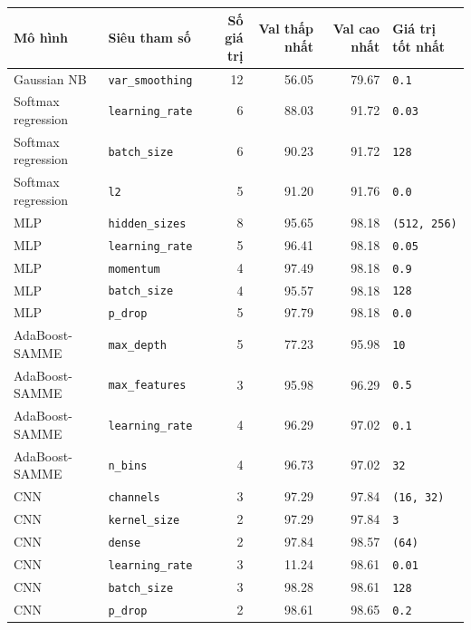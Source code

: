 \begin{tabular}{llrrrl}
\toprule
Mô hình & Siêu tham số & Số giá trị & Val thấp nhất & Val cao nhất & Giá trị tốt nhất \\
\midrule
Gaussian NB & \texttt{var\_smoothing} & 12 & 56.05 & 79.67 & \texttt{0.1} \\
Softmax regression & \texttt{learning\_rate} & 6 & 88.03 & 91.72 & \texttt{0.03} \\
Softmax regression & \texttt{batch\_size} & 6 & 90.23 & 91.72 & \texttt{128} \\
Softmax regression & \texttt{l2} & 5 & 91.20 & 91.76 & \texttt{0.0} \\
MLP & \texttt{hidden\_sizes} & 8 & 95.65 & 98.18 & \texttt{(512, 256)} \\
MLP & \texttt{learning\_rate} & 5 & 96.41 & 98.18 & \texttt{0.05} \\
MLP & \texttt{momentum} & 4 & 97.49 & 98.18 & \texttt{0.9} \\
MLP & \texttt{batch\_size} & 4 & 95.57 & 98.18 & \texttt{128} \\
MLP & \texttt{p\_drop} & 5 & 97.79 & 98.18 & \texttt{0.0} \\
AdaBoost-SAMME & \texttt{max\_depth} & 5 & 77.23 & 95.98 & \texttt{10} \\
AdaBoost-SAMME & \texttt{max\_features} & 3 & 95.98 & 96.29 & \texttt{0.5} \\
AdaBoost-SAMME & \texttt{learning\_rate} & 4 & 96.29 & 97.02 & \texttt{0.1} \\
AdaBoost-SAMME & \texttt{n\_bins} & 4 & 96.73 & 97.02 & \texttt{32} \\
CNN & \texttt{channels} & 3 & 97.29 & 97.84 & \texttt{(16, 32)} \\
CNN & \texttt{kernel\_size} & 2 & 97.29 & 97.84 & \texttt{3} \\
CNN & \texttt{dense} & 2 & 97.84 & 98.57 & \texttt{(64)} \\
CNN & \texttt{learning\_rate} & 3 & 11.24 & 98.61 & \texttt{0.01} \\
CNN & \texttt{batch\_size} & 3 & 98.28 & 98.61 & \texttt{128} \\
CNN & \texttt{p\_drop} & 2 & 98.61 & 98.65 & \texttt{0.2} \\
\bottomrule
\end{tabular}
